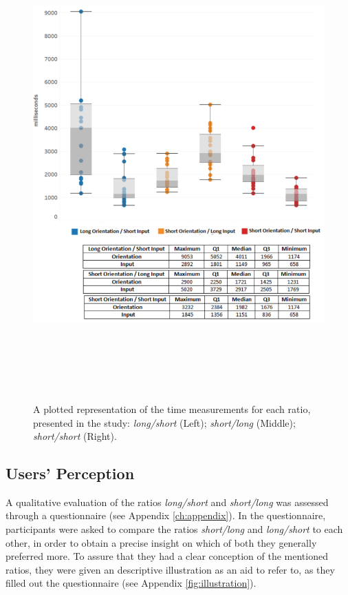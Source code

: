 \begin{figure}[H]
\centering
\includegraphics[width=15cm, height=18cm]{Chapters/graphics/Times.png}
\caption{A plotted representation of the time measurements for each ratio, presented in the study: \textit{long/short} (Left);  \textit{short/long} (Middle); \textit{short/short} (Right).}
\label{fig:times}
\end{figure}

\subsection{Users' Perception}

A qualitative evaluation of the ratios \textit{long/short} and \textit{short/long} was assessed through a questionnaire (see Appendix \ref{ch:appendix}). In the questionnaire, participants were asked to compare the ratios \textit{short/long} and \textit{long/short} to each other, in order to obtain a precise insight on which of both they generally preferred more. To assure that they had a clear conception of the mentioned ratios, they were given an descriptive illustration as an aid to refer to, as they filled out the questionnaire (see Appendix \ref{fig:illustration}).\\

